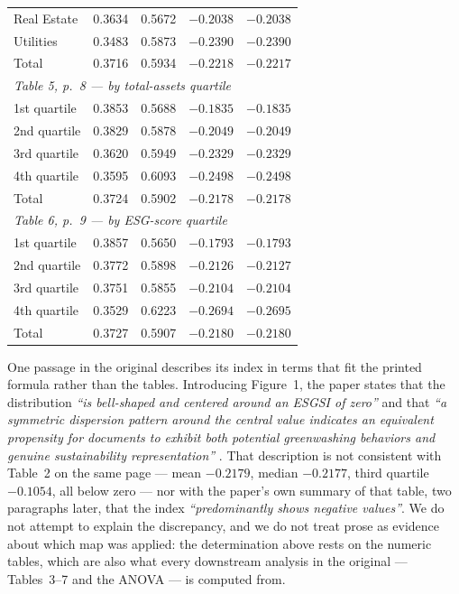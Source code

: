 \begin{table}[htbp]
\begin{tabular}{lrrrr}
Real Estate            & 0.3634 & 0.5672 & $-0.2038$ & $-0.2038$ \\
Utilities              & 0.3483 & 0.5873 & $-0.2390$ & $-0.2390$ \\
Total                  & 0.3716 & 0.5934 & $-0.2218$ & $-0.2217$ \\
\midrule
\multicolumn{5}{l}{\emph{Table 5, p.~8 --- by total-assets quartile}} \\
1st quartile           & 0.3853 & 0.5688 & $-0.1835$ & $-0.1835$ \\
2nd quartile           & 0.3829 & 0.5878 & $-0.2049$ & $-0.2049$ \\
3rd quartile           & 0.3620 & 0.5949 & $-0.2329$ & $-0.2329$ \\
4th quartile           & 0.3595 & 0.6093 & $-0.2498$ & $-0.2498$ \\
Total                  & 0.3724 & 0.5902 & $-0.2178$ & $-0.2178$ \\
\midrule
\multicolumn{5}{l}{\emph{Table 6, p.~9 --- by ESG-score quartile}} \\
1st quartile           & 0.3857 & 0.5650 & $-0.1793$ & $-0.1793$ \\
2nd quartile           & 0.3772 & 0.5898 & $-0.2126$ & $-0.2127$ \\
3rd quartile           & 0.3751 & 0.5855 & $-0.2104$ & $-0.2104$ \\
4th quartile           & 0.3529 & 0.6223 & $-0.2694$ & $-0.2695$ \\
Total                  & 0.3727 & 0.5907 & $-0.2180$ & $-0.2180$ \\
\bottomrule
\end{tabular}
\end{table}

One passage in the original describes its index in terms that fit the printed
formula rather than the tables. Introducing Figure~1, the paper states that the
distribution \emph{``is bell-shaped and centered around an ESGSI of zero''} and
that \emph{``a symmetric dispersion pattern around the central value indicates
an equivalent propensity for documents to exhibit both potential greenwashing
behaviors and genuine sustainability representation''} \citep[p.~6]{lagasio2024}.
That description is not consistent with Table~2 on the same page --- mean
$-0.2179$, median $-0.2177$, third quartile $-0.1054$, all below zero --- nor
with the paper's own summary of that table, two paragraphs later, that the index
\emph{``predominantly shows negative values''}. We do not attempt to explain the
discrepancy, and we do not treat prose as evidence about which map was applied:
the determination above rests on the numeric tables, which are also what every
downstream analysis in the original --- Tables~3--7 and the ANOVA --- is
computed from.

